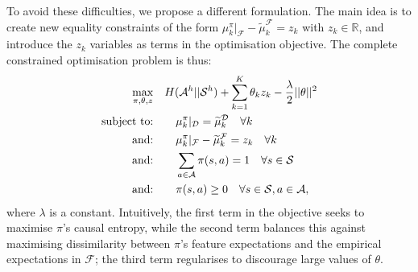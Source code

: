 \documentclass[letterpaper]{article}
\newcommand{\sw}[1]{\textcolor{red}{SW: #1}}
\newcommand{\jm}[1]{\textcolor{blue}{Joao: #1}}
\newcommand{\sw}[1]{}
\newcommand{\jm}[1]{}
\begin{document}
To avoid these difficulties, we propose a different formulation.  The main idea is to create new equality constraints of the form $\mu_k^{\pi}|_{\mathcal{F}} -\widetilde{\mu}_k^{\mathcal{F}}=z_k$ with $z_k\in\mathbb R$, and introduce the $z_k$ variables as terms in the optimisation objective.  The complete constrained optimisation problem is thus:
\begin{align}
 \quad\max\limits_{\pi,\theta,z}&\quad H(\mathcal{A}^h||\mathcal{S}^h) + \sum_{k=1}^K \theta_k z_k - \frac{\lambda}{2}||\mathbf{\theta}||^2 \label{eq:primal_obj_failure}\\
\hbox{subject to:}&\quad \quad\mu^{\pi}_k|_{\mathcal{D}}=\widetilde{\mu}^{\mathcal{D}}_k\quad\forall k \label{eq:features_equality_constraint_failure}\\
\hbox{and:}&\quad \quad  \mu_k^{\pi}|_{\mathcal{F}} -\widetilde{\mu}_k^{\mathcal{F}}=z_k \quad \forall k\\
\hbox{and:}&\quad \quad\sum_{a\in\mathcal{A}}\pi(s,a)  = 1\quad\forall s\in\mathcal{S}\\
\hbox{and:}&\quad \quad\pi(s,a) \geq 0\quad\forall s\in\mathcal{S},a\in\mathcal{A},  
\end{align}
where $\lambda$ is a constant.  
Intuitively, the first term in the objective seeks to maximise $\pi$'s causal entropy, while the second term balances this against maximising dissimilarity between $\pi$'s feature expectations and the empirical expectations in $\mathcal{F}$; the third term regularises to discourage large values of $\theta$.
\end{document}
